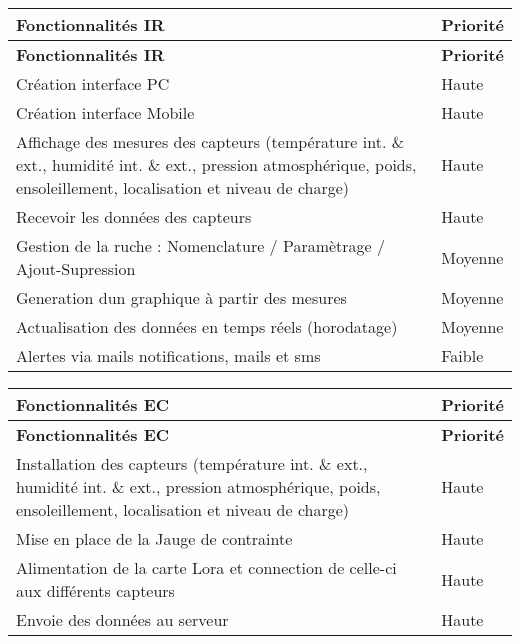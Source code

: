 \tabulinesep=1mm
\begin{longtabu} spread 0pt [c]{*{2}{|X[-1]}|}
\hline
\rowcolor{\tableheadbgcolor}\textbf{ Fonctionnalités IR }&\textbf{ Priorité  }\\
\endfirsthead
\hline
\endfoot
\hline
\rowcolor{\tableheadbgcolor}\textbf{ Fonctionnalités IR }&\textbf{ Priorité  }\\
\endhead
Création interface PC &Haute \\
Création interface Mobile &Haute \\
Affichage des mesures des capteurs (température int. \& ext., humidité int. \& ext., pression atmosphérique, poids, ensoleillement, localisation et niveau de charge) &Haute \\
Recevoir les données des capteurs &Haute \\
Gestion de la ruche \+: Nomenclature / Paramètrage / Ajout-\/\+Supression &Moyenne \\
Generation d\textquotesingle{}un graphique à partir des mesures &Moyenne \\
Actualisation des données en temps réels (horodatage) &Moyenne \\
Alertes via mails notifications, mails et sms &Faible \\
\end{longtabu}
\tabulinesep=1mm
\begin{longtabu} spread 0pt [c]{*{2}{|X[-1]}|}
\hline
\rowcolor{\tableheadbgcolor}\textbf{ Fonctionnalités EC }&\textbf{ Priorité  }\\
\endfirsthead
\hline
\endfoot
\hline
\rowcolor{\tableheadbgcolor}\textbf{ Fonctionnalités EC }&\textbf{ Priorité  }\\
\endhead
Installation des capteurs (température int. \& ext., humidité int. \& ext., pression atmosphérique, poids, ensoleillement, localisation et niveau de charge) &Haute \\
Mise en place de la Jauge de contrainte &Haute \\
Alimentation de la carte Lora et connection de celle-\/ci aux différents capteurs &Haute \\
Envoie des données au serveur &Haute \\
\end{longtabu}


 



